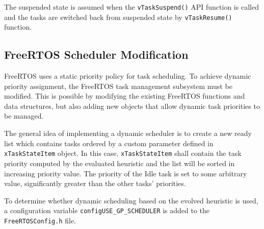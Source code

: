 The suspended state is assumed when the \verb$vTaskSuspend()$ API function is called and the tasks are switched back from suspended state by \verb$vTaskResume()$ function.

\subsection{FreeRTOS Scheduler Modification}
FreeRTOS uses a static priority policy for task scheduling. 
To achieve dynamic priority assignment, the FreeRTOS task management subsystem must be modified. 
This is possible by modifying the existing FreeRTOS functions and data structures, but also adding new objects that allow dynamic task priorities to be managed. 

The general idea of implementing a dynamic scheduler is to create a new ready list which contains tasks ordered by a custom parameter defined in \verb$xTaskStateItem$ object.
In this case, \verb$xTaskStateItem$ shall contain the task priority computed by the evaluated heuristic and the list will be sorted in increasing priority value. 
The priority of the Idle task is set to some arbitrary value, significantly greater than the other tasks' priorities. 

To determine whether dynamic scheduling based on the evolved heuristic is used, a configuration variable \verb$configUSE_GP_SCHEDULER$ is added to the \verb$FreeRTOSConfig.h$ file. 


